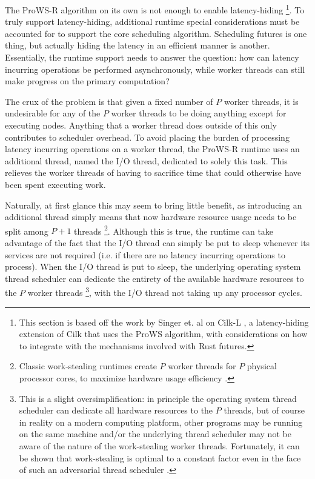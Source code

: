 \documentclass[bsc,frontabs,singlespacing,parskip,deptreport,normalheadings]{infthesis}
\begin{document}
The ProWS-R algorithm on its own is not enough to enable latency-hiding
\footnote{This section is based off the work by Singer et. al on Cilk-L
\cite{singer_scheduling_2019}, a latency-hiding extension of Cilk that uses the
ProWS algorithm, with considerations on how to integrate with the mechanisms
involved with Rust futures.}. To truly support latency-hiding, additional
runtime special considerations must be accounted for to support the core
scheduling algorithm. Scheduling futures is one thing, but actually hiding the
latency in an efficient manner is another. Essentially, the runtime support
needs to answer the question: how can latency incurring operations be performed
asynchronously, while worker threads can still make progress on the primary
computation?

The crux of the problem is that given a fixed number of \(P\) worker threads, it
is undesirable for any of the \(P\) worker threads to be doing anything except
for executing nodes. Anything that a worker thread does outside of this only
contributes to scheduler overhead. To avoid placing the burden of processing
latency incurring operations on a worker thread, the ProWS-R runtime uses an
additional thread, named the I/O thread, dedicated to solely this task. This
relieves the worker threads of having to sacrifice time that could otherwise
have been spent executing work.

Naturally, at first glance this may seem to bring little benefit, as introducing
an additional thread simply means that now hardware resource usage needs to be
split among \(P + 1\) threads \footnote{Classic work-stealing runtimes create
    \(P\) worker threads for \(P\) physical processor cores, to maximize
hardware usage efficiency \cite{arora_thread_1998}.}. Although this is true, the
runtime can take advantage of the fact that the I/O thread can simply be put to
sleep whenever its services are not required (i.e. if there are no latency
incurring operations to process). When the I/O thread is put to sleep, the
underlying operating system thread scheduler can dedicate the entirety of the
available hardware resources to the \(P\) worker threads \footnote{This is a
    slight oversimplification: in principle the operating system thread
    scheduler can dedicate all hardware resources to the \(P\) threads, but of
    course in reality on a modern computing platform, other programs may be
    running on the same machine and/or the underlying thread scheduler may not
    be aware of the nature of the work-stealing worker threads. Fortunately, it
can be shown that work-stealing is optimal to a constant factor even in the face
of such an adversarial thread scheduler \cite{arora_thread_1998}.}, with the I/O
thread not taking up any processor cycles.
\end{document}
